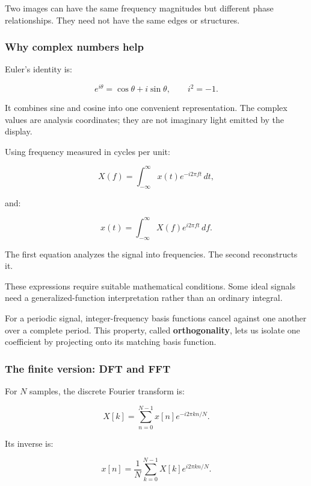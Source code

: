 Two images can have the same frequency magnitudes but different phase relationships. They need not have the same edges or structures.

\subsubsection{Why complex numbers help}\label{04-visual-computing-ii-ch043-why-complex-numbers-help}

\hypertarget{04-visual-computing-ii-ch043-why-complex-numbers-help}{}

Euler's identity is:

\[
e^{i\theta}=\cos\theta+i\sin\theta,\qquad i^2=-1.
\]

It combines sine and cosine into one convenient representation. The complex values are analysis coordinates; they are not imaginary light emitted by the display.

Using frequency measured in cycles per unit:

\[
X(f)=\int_{-\infty}^{\infty}x(t)e^{-i2\pi ft}\,dt,
\]

and:

\[
x(t)=\int_{-\infty}^{\infty}X(f)e^{i2\pi ft}\,df.
\]

The first equation analyzes the signal into frequencies. The second reconstructs it.

These expressions require suitable mathematical conditions. Some ideal signals need a generalized-function interpretation rather than an ordinary integral.

For a periodic signal, integer-frequency basis functions cancel against one another over a complete period. This property, called \textbf{orthogonality}, lets us isolate one coefficient by projecting onto its matching basis function.

\subsubsection{The finite version: DFT and FFT}\label{04-visual-computing-ii-ch043-the-finite-version-dft-and-fft}

\hypertarget{04-visual-computing-ii-ch043-the-finite-version-dft-and-fft}{}

For \(N\) samples, the discrete Fourier transform is:

\[
X[k]=\sum_{n=0}^{N-1}x[n]e^{-i2\pi kn/N}.
\]

Its inverse is:

\[
x[n]=\frac1N\sum_{k=0}^{N-1}X[k]e^{i2\pi kn/N}.
\]

